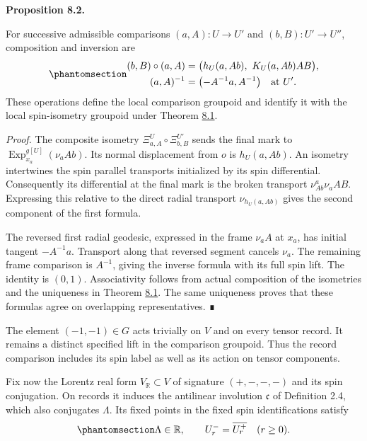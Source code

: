 \documentclass[
  english,
  11pt,
  reqno]{amsart}
\makeatletter
\newcommand{\pandocstatementheading}[1]{%
  \par\addpenalty{\@beginparpenalty}%
  \addvspace{.5\baselineskip plus .2\baselineskip minus .2\baselineskip}%
  {\normalfont\bfseries #1\par}%
  \nobreak\@afterindenttrue\@afterheading
}
\makeatother
\begin{document}
\pandocstatementheading{\protect{}\label{prop:es-composition}Proposition 8.2.}

For successive admissible comparisons \((a,A):U\to U'\) and
\((b,B):U'\to U''\), composition and inversion are
\begin{equation}\protect\phantomsection\label{eq:es-record-composition}{
 \begin{aligned}
 (b,B)\circ(a,A)
   &=\bigl(h_U(a,Ab),\ K_U(a,Ab)AB\bigr),\\
 (a,A)^{-1}
   &=\bigl(-A^{-1}a,A^{-1}\bigr)\quad\text{at }U'.
 \end{aligned}
}\end{equation} These operations define the local comparison groupoid
and identify it with the local spin-isometry groupoid under Theorem
\hyperref[thm:es-physical-arrows]{8.1}.

\emph{Proof.} The composite isometry \(\Xi^U_{a,A}\circ\Xi^{U'}_{b,B}\)
sends the final mark to \(\operatorname{Exp}^{g[U]}_{x_a}(\nu_aAb)\).
Its normal displacement from \(o\) is \(h_U(a,Ab)\). An isometry
intertwines the spin parallel transports initialized by its spin
differential. Consequently its differential at the final mark is the
broken transport \(\nu^{a}_{Ab}\nu_aAB\). Expressing this relative to
the direct radial transport \(\nu_{h_U(a,Ab)}\) gives the second
component of the first formula.

The reversed first radial geodesic, expressed in the frame \(\nu_aA\) at
\(x_a\), has initial tangent \(-A^{-1}a\). Transport along that reversed
segment cancels \(\nu_a\). The remaining frame comparison is \(A^{-1}\),
giving the inverse formula with its full spin lift. The identity is
\((0,1)\). Associativity follows from actual composition of the
isometries and the uniqueness in Theorem
\hyperref[thm:es-physical-arrows]{8.1}. The same uniqueness proves that
these formulas agree on overlapping representatives. ∎

The element \((-1,-1)\in G\) acts trivially on \(V\) and on every tensor
record. It remains a distinct specified lift in the comparison groupoid.
Thus the record comparison includes its spin label as well as its action
on tensor components.

Fix now the Lorentz real form \(V_{\mathbb R}\subset V\) of signature
\((+,-,-,-)\) and its spin conjugation. On records it induces the
antilinear involution \(\mathfrak c\) of Definition 2.4, which also
conjugates \(\Lambda\). Its fixed points in the fixed spin
identifications satisfy
\begin{equation}\protect\phantomsection\label{eq:es-lorentz-records}{
 \Lambda\in\mathbb R,\qquad
 U_r^-=\overline{U_r^+}\quad(r\ge0).
}\end{equation}
\end{document}

